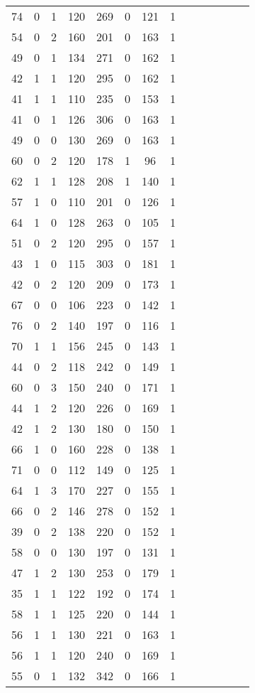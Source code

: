 \documentclass{article}
\begin{document}
\begin{longtable}{|c|c|c|c|c|c|c|c|c|c|c|c|c|c|}
74 & 0 & 1 & 120 & 269 & 0 & 121 & 1\\
54 & 0 & 2 & 160 & 201 & 0 & 163 & 1\\
49 & 0 & 1 & 134 & 271 & 0 & 162 & 1\\
42 & 1 & 1 & 120 & 295 & 0 & 162 & 1\\
41 & 1 & 1 & 110 & 235 & 0 & 153 & 1\\
41 & 0 & 1 & 126 & 306 & 0 & 163 & 1\\
49 & 0 & 0 & 130 & 269 & 0 & 163 & 1\\
60 & 0 & 2 & 120 & 178 & 1 & 96 & 1\\
62 & 1 & 1 & 128 & 208 & 1 & 140 & 1\\
57 & 1 & 0 & 110 & 201 & 0 & 126 & 1\\
64 & 1 & 0 & 128 & 263 & 0 & 105 & 1\\
51 & 0 & 2 & 120 & 295 & 0 & 157 & 1\\
43 & 1 & 0 & 115 & 303 & 0 & 181 & 1\\
42 & 0 & 2 & 120 & 209 & 0 & 173 & 1\\
67 & 0 & 0 & 106 & 223 & 0 & 142 & 1\\
76 & 0 & 2 & 140 & 197 & 0 & 116 & 1\\
70 & 1 & 1 & 156 & 245 & 0 & 143 & 1\\
44 & 0 & 2 & 118 & 242 & 0 & 149 & 1\\
60 & 0 & 3 & 150 & 240 & 0 & 171 & 1\\
44 & 1 & 2 & 120 & 226 & 0 & 169 & 1\\
42 & 1 & 2 & 130 & 180 & 0 & 150 & 1\\
66 & 1 & 0 & 160 & 228 & 0 & 138 & 1\\
71 & 0 & 0 & 112 & 149 & 0 & 125 & 1\\
64 & 1 & 3 & 170 & 227 & 0 & 155 & 1\\
66 & 0 & 2 & 146 & 278 & 0 & 152 & 1\\
39 & 0 & 2 & 138 & 220 & 0 & 152 & 1\\
58 & 0 & 0 & 130 & 197 & 0 & 131 & 1\\
47 & 1 & 2 & 130 & 253 & 0 & 179 & 1\\
35 & 1 & 1 & 122 & 192 & 0 & 174 & 1\\
58 & 1 & 1 & 125 & 220 & 0 & 144 & 1\\
56 & 1 & 1 & 130 & 221 & 0 & 163 & 1\\
56 & 1 & 1 & 120 & 240 & 0 & 169 & 1\\
55 & 0 & 1 & 132 & 342 & 0 & 166 & 1\\

\end{longtable}
\end{document}

